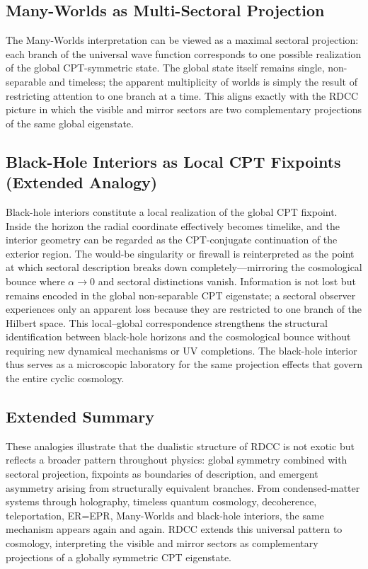 \documentclass[11pt,a4paper]{article}
\begin{document}
\subsection{Many-Worlds as Multi-Sectoral Projection}

The Many-Worlds interpretation can be viewed as a maximal sectoral projection: each branch of the universal wave function corresponds to one possible realization of the global CPT-symmetric state. The global state itself remains single, non-separable and timeless; the apparent multiplicity of worlds is simply the result of restricting attention to one branch at a time. This aligns exactly with the RDCC picture in which the visible and mirror sectors are two complementary projections of the same global eigenstate.

\subsection{Black-Hole Interiors as Local CPT Fixpoints (Extended Analogy)}

Black-hole interiors constitute a local realization of the global CPT fixpoint. Inside the horizon the radial coordinate effectively becomes timelike, and the interior geometry can be regarded as the CPT-conjugate continuation of the exterior region. The would-be singularity or firewall is reinterpreted as the point at which sectoral description breaks down completely—mirroring the cosmological bounce where $\alpha\to 0$ and sectoral distinctions vanish. Information is not lost but remains encoded in the global non-separable CPT eigenstate; a sectoral observer experiences only an apparent loss because they are restricted to one branch of the Hilbert space. This local–global correspondence strengthens the structural identification between black-hole horizons and the cosmological bounce without requiring new dynamical mechanisms or UV completions. The black-hole interior thus serves as a microscopic laboratory for the same projection effects that govern the entire cyclic cosmology.

\subsection{Extended Summary}

These analogies illustrate that the dualistic structure of RDCC is not exotic but reflects a broader pattern throughout physics: global symmetry combined with sectoral projection, fixpoints as boundaries of description, and emergent asymmetry arising from structurally equivalent branches. From condensed-matter systems through holography, timeless quantum cosmology, decoherence, teleportation, ER=EPR, Many-Worlds and black-hole interiors, the same mechanism appears again and again. RDCC extends this universal pattern to cosmology, interpreting the visible and mirror sectors as complementary projections of a globally symmetric CPT eigenstate.
\end{document}
